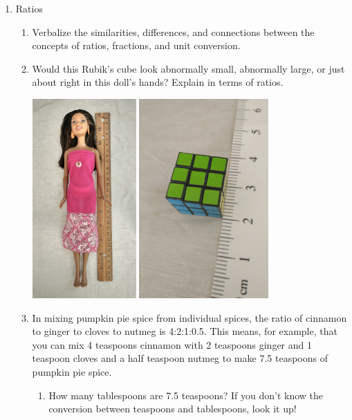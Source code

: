 \begin{enumerate}
\item Ratios
\begin{enumerate}
\item Verbalize the similarities, differences, and connections between the concepts of ratios, fractions, and unit conversion.
\item Would this Rubik's cube look abnormally small, abnormally large, or just about right in this doll's hands? Explain in terms of ratios.
\begin{center}
\includegraphics[height=3in]{images/doll} \includegraphics[height=3in]{images/RubiksCube}
\end{center}
\item In mixing pumpkin pie spice from individual spices, the ratio of cinnamon to ginger to cloves to nutmeg is 4:2:1:0.5. This means, for example, that you can mix 4 teaspoons cinnamon with 2 teaspoons ginger and 1 teaspoon cloves and a half teaspoon nutmeg to make 7.5 teaspoons of pumpkin pie spice.
\begin{enumerate}
\item How many tablespoons are 7.5 teaspoons? If you don't know the conversion between teaspoons and tablespoons, look it up! 

\end{enumerate}
\end{enumerate}
\end{enumerate}
